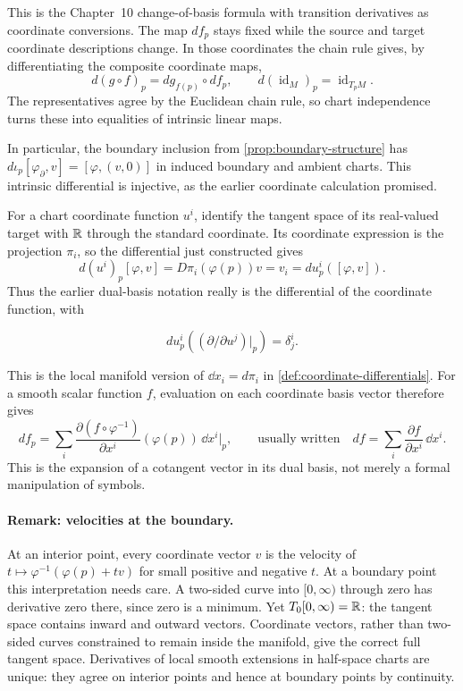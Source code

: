 
This is the Chapter~10 change-of-basis formula with transition derivatives
as coordinate conversions. The map $df_p$ stays fixed while the source and
target coordinate descriptions change. In those coordinates the chain rule
gives, by differentiating the composite coordinate maps,
\[
d(g\circ f)_p=dg_{f(p)}\circ df_p,\qquad
d(\operatorname{id}_M)_p=\operatorname{id}_{T_pM}.
\]
The representatives agree by the Euclidean chain rule, so chart independence
turns these into equalities of intrinsic linear maps.

In particular, the boundary inclusion from \cref{prop:boundary-structure}
has $d\iota_p[\varphi_{\partial},v]=[\varphi,(v,0)]$ in induced
boundary and ambient charts. This intrinsic differential is injective,
as the earlier coordinate calculation promised.

For a chart coordinate function $u^i$, identify the tangent space of its
real-valued target with $\mathbb{R}$ through the standard coordinate. Its coordinate
expression is the projection $\pi_i$, so the differential just constructed gives
\[
d(u^i)_p[\varphi,v]=D\pi_i(\varphi(p))v=v_i
 =du^i_p([\varphi,v]).
\]
Thus the earlier dual-basis notation really is the differential of the
coordinate function, with

\[
du^i_p((\partial/\partial u^j)|_p)=\delta^i_j.
\]

This is the local manifold version of $\dd x_i=d\pi_i$ in
\cref{def:coordinate-differentials}.
For a smooth scalar function $f$, evaluation on each coordinate basis vector
therefore gives
\[
df_p=\sum_i\frac{\partial(f\circ\varphi^{-1})}{\partial x^i}
             (\varphi(p))\,\dd x^i|_p,
\qquad\text{usually written}\quad df=\sum_i\frac{\partial f}{\partial x^i}\,\dd x^i.
\]
This is the expansion of a cotangent vector in its dual basis, not merely
a formal manipulation of symbols.

\paragraph{Remark: velocities at the boundary.}
At an interior point, every coordinate vector $v$ is the velocity of
$t\mapsto\varphi^{-1}(\varphi(p)+tv)$ for small positive and negative $t$.
At a boundary point this interpretation needs care. A two-sided curve into
$[0,\infty)$ through zero has derivative zero there, since zero is a
minimum. Yet $T_0[0,\infty)=\mathbb{R}$: the tangent space contains inward and
outward vectors. Coordinate vectors, rather than two-sided curves constrained
to remain inside the manifold, give the correct full tangent space.
Derivatives of local smooth extensions in half-space charts are unique:
they agree on interior points and hence at boundary points by continuity.



